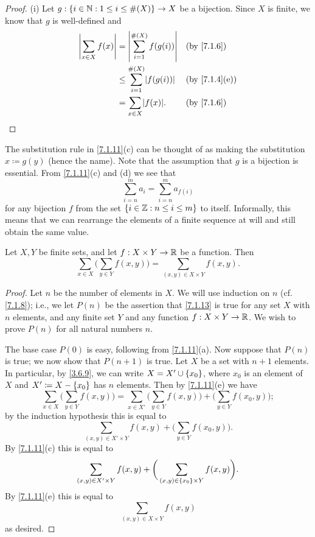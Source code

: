 \begin{proof}{(i)}
  Let \(g : \left\lbrace i \in \mathbb{N} : 1 \leq i \leq \#(X)\right\rbrace \to X\) be a bijection.
  Since \(X\) is finite, we know that \(g\) is well-defined and
  \begin{align*}
    \abs{\sum_{x \in X} f(x)} & = \abs{\sum_{i = 1}^{\#(X)} f(g(i))}    &  & \by{7.1.6}                  \\
                              & \leq \sum_{i = 1}^{\#(X)} \abs{f(g(i))} &  & \text{(by \cref{7.1.4}(e))} \\
                              & = \sum_{x \in X} \abs{f(x)}.            &  & \by{7.1.6}
  \end{align*}
\end{proof}

\begin{rmk}\label{7.1.12}
  The substitution rule in \cref{7.1.11}(c) can be thought of as making the substitution \(x \coloneqq g(y)\) (hence the name).
  Note that the assumption that \(g\) is a bijection is essential.
  From \cref{7.1.11}(c) and (d) we see that
  \[
    \sum_{i = n}^m a_i = \sum_{i = n}^m a_{f(i)}
  \]
  for any bijection \(f\) from the set \(\left\lbrace i \in \mathbb{Z} : n \leq i \leq m\right\rbrace\) to itself.
  Informally, this means that we can rearrange the elements of a finite sequence at will and still obtain the same value.
\end{rmk}

\begin{lem}\label{7.1.13}
  Let \(X, Y\) be finite sets, and let \(f : X \times Y \to \mathbb{R}\) be a function.
  Then
  \[
    \sum_{x \in X} \bigg(\sum_{y \in Y} f(x, y)\bigg) = \sum_{(x, y) \in X \times Y} f(x, y).
  \]
\end{lem}

\begin{proof}
  Let \(n\) be the number of elements in \(X\).
  We will use induction on \(n\) (cf. \cref{7.1.8});
  i.e., we let \(P(n)\) be the assertion that \cref{7.1.13} is true for any set \(X\) with \(n\) elements, and any finite set \(Y\) and any function \(f : X \times Y \to \mathbb{R}\).
  We wish to prove \(P(n)\) for all natural numbers \(n\).

  The base case \(P(0)\) is easy, following from \cref{7.1.11}(a).
  Now suppose that \(P(n)\) is true;
  we now show that \(P(n + 1)\) is true.
  Let \(X\) be a set with \(n + 1\) elements.
  In particular, by \cref{3.6.9}, we can write \(X = X' \cup \left\lbrace x_0\right\rbrace\), where \(x_0\) is an element of \(X\) and \(X' \coloneqq X - \left\lbrace x_0\right\rbrace\) has \(n\) elements.
  Then by \cref{7.1.11}(e) we have
  \[
    \sum_{x \in X} \bigg(\sum_{y \in Y} f(x, y)\bigg) = \sum_{x \in X'} \bigg(\sum_{y \in Y} f(x, y)\bigg) + \bigg(\sum_{y \in Y} f(x_0, y)\bigg);
  \]
  by the induction hypothesis this is equal to
  \[
    \sum_{(x, y) \in X' \times Y} f(x, y) + \bigg(\sum_{y \in Y} f(x_0, y)\bigg).
  \]
  By \cref{7.1.11}(c) this is equal to
  \[
    \sum_{(x, y) \in X' \times Y} f(x, y) + \bigg(\sum_{(x, y) \in \left\lbrace x_0\right\rbrace \times Y} f(x, y)\bigg).
  \]
  By \cref{7.1.11}(e) this is equal to
  \[
    \sum_{(x, y) \in X \times Y} f(x, y)
  \]
  as desired.
\end{proof}

